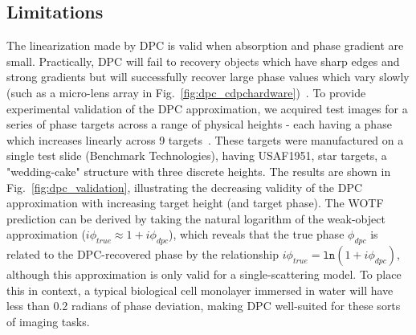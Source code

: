 \subsection{Limitations}
The linearization made by DPC is valid when absorption and phase gradient are small. Practically, DPC will fail to recovery objects which have sharp edges and strong gradients but will successfully recover large phase values which vary slowly (such as a micro-lens array in Fig.~\ref{fig:dpc_cdpchardware})~\cite{Claus2015, chen2018quantitative}. To provide experimental validation of the DPC approximation, we acquired test images for a series of phase targets across a range of physical heights - each having a phase which increases linearly across 9 targets~\cite{phillipstechnical}. These targets were manufactured on a single test slide (Benchmark Technologies), having USAF1951, star targets, a "wedding-cake" structure with three discrete heights. The results are shown in Fig.~\ref{fig:dpc_validation}, illustrating the decreasing validity of the DPC approximation with increasing target height (and target phase). The WOTF prediction can be derived by taking the natural logarithm of the weak-object approximation ($i\phi_{true} \approx 1 + i\phi_{dpc}$), which reveals that the true phase $\phi_{dpc}$ is related to the DPC-recovered phase by the relationship $i\phi_{true}= \texttt{ln}(1 + i\phi_{dpc})$, although this approximation is only valid for a single-scattering model. To place this in context, a typical biological cell monolayer immersed in water will have less than 0.2 radians of phase deviation, making DPC well-suited for these sorts of imaging tasks.

%
%

